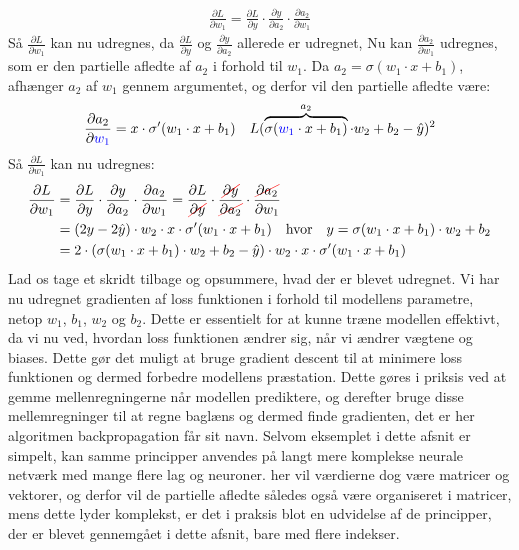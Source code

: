 \documentclass{article}
\newcommand\Ccancel[2][black]{
    \let\OldcancelColor\CancelColor
    \renewcommand\CancelColor{\color{#1}}
    \cancel{#2}
    \renewcommand\CancelColor{\OldcancelColor}
}
\begin{document}
\begin{align}
  \frac{\partial L}{\partial w_1} = \frac{\partial L}{\partial y} \cdot \frac{\partial y}{\partial a_2} \cdot \frac{\partial a_2}{\partial w_1}
\end{align}
Så $\frac{\partial L}{\partial w_1}$ kan nu udregnes, da $\frac{\partial L}{\partial y}$ og $\frac{\partial y}{\partial a_2}$ allerede er udregnet, Nu kan $\frac{\partial a_2}{\partial w_1}$ udregnes, som er den partielle afledte af $a_2$ i forhold til $w_1$. Da $a_2 = \sigma(w_1 \cdot x + b_1)$, afhænger $a_2$ af $w_1$ gennem argumentet, og derfor vil den partielle afledte være:
\begin{align}
  \frac{\partial a_2}{\partial {\color{blue}w_1}} = x \cdot \sigma'(w_1 \cdot x + b_1) && L(\overbrace{\sigma({\color{blue}w_1} \cdot x + b_1)}^{a_2} \cdot w_2 + b_2  - \hat{y})^2
\end{align}
Så $\frac{\partial L}{\partial w_1}$ kan nu udregnes:
\begin{align}
  \frac{\partial L}{\partial w_1} &= \frac{\partial L}{\partial y} \cdot \frac{\partial y}{\partial a_2} \cdot \frac{\partial a_2}{\partial w_1} = \frac{\partial L}{\Ccancel[red]{\partial y}} \cdot \frac{\Ccancel[red]{\partial y}}{\Ccancel[red]{\partial a_2}} \cdot \frac{\Ccancel[red]{\partial a_2}}{\partial w_1}\\
  &= (2y - 2\hat{y}) \cdot w_2 \cdot x \cdot \sigma'(w_1 \cdot x + b_1) \quad\text{hvor}\quad y = \sigma(w_1 \cdot x + b_1) \cdot w_2 + b_2\\
  &= 2\cdot(\sigma(w_1 \cdot x + b_1) \cdot w_2 + b_2 - \hat{y}) \cdot w_2 \cdot x \cdot \sigma'(w_1 \cdot x + b_1)
\end{align}
Lad os tage et skridt tilbage og opsummere, hvad der er blevet udregnet. Vi har nu udregnet gradienten af loss funktionen i forhold til modellens parametre, netop $w_1$, $b_1$, $w_2$ og $b_2$. Dette er essentielt for at kunne træne modellen effektivt, da vi nu ved, hvordan loss funktionen ændrer sig, når vi ændrer vægtene og biases. Dette gør det muligt at bruge gradient descent til at minimere loss funktionen og dermed forbedre modellens præstation. Dette gøres i priksis ved at gemme mellenregningerne når modellen prediktere, og derefter bruge disse mellemregninger til at regne baglæns og dermed finde gradienten, det er her algoritmen backpropagation får sit navn. Selvom eksemplet i dette afsnit er simpelt, kan samme principper anvendes på langt mere komplekse neurale netværk med mange flere lag og neuroner. her vil værdierne dog være matricer og vektorer, og derfor vil de partielle afledte således også være organiseret i matricer, mens dette lyder komplekst, er det i praksis blot en udvidelse af de principper, der er blevet gennemgået i dette afsnit, bare med flere indekser.


\newpage
\printbibliography
\end{document}
